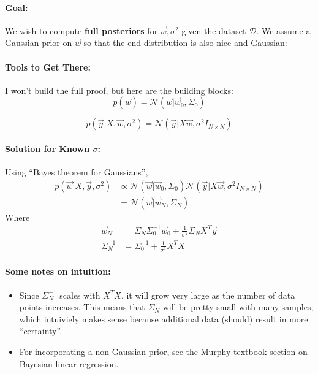 \documentclass[a4paper,12pt]{report}
\begin{document}
\paragraph{Goal: } We wish to compute \textbf{full posteriors} for $\vec w, \sigma^2$ given the dataset $\mathcal D$. We assume a Gaussian prior on $\vec w$ so that the end distribution is also nice and Gaussian:

\paragraph{Tools to Get There: } I won't build the full proof, but here are the building blocks:
\begin{equation}
p(\vec w) = \mathcal N(\vec w | \vec w_0, \Sigma_0)
\end{equation}

\begin{equation}
p(\vec y | X, \vec w, \sigma^2) = \mathcal N(\vec y | X\vec w, \sigma^2I_{N\times N})
\end{equation}

\paragraph{Solution for Known $\sigma$: } Using ``Bayes theorem for Gaussians'',
\begin{equation}
\begin{split}
p(\vec w | X, \vec y, \sigma^2) &\propto \mathcal N(\vec w | \vec w_0, \Sigma_0)\mathcal N(\vec y | X\vec w, \sigma^2 I_{N\times N}) \\
&= \mathcal N(\vec w | \vec w_N, \Sigma_N)
\end{split}
\end{equation}
Where 
\begin{equation}
\begin{split}
\vec w_N &= \Sigma_N\Sigma_0^{-1}\vec w_0 + \frac{1}{\sigma^2} \Sigma_N X^T\vec y \\
\Sigma_N^{-1} &= \Sigma_0^{-1} + \frac{1}{\sigma^2} X^T X
\end{split}
\end{equation}



\paragraph{Some notes on intuition: } 
\begin{itemize}
\item Since $\Sigma_N^{-1}$ scales with $X^T X$, it will grow very large as the number of data points increases. This means that $\Sigma_N$ will be pretty small with many samples, which intuiviely makes sense because additional data (should) result in more ``certainty''.
\item For incorporating a non-Gaussian prior, see the Murphy textbook section on Bayesian linear regression.
\end{itemize}
\end{document}
